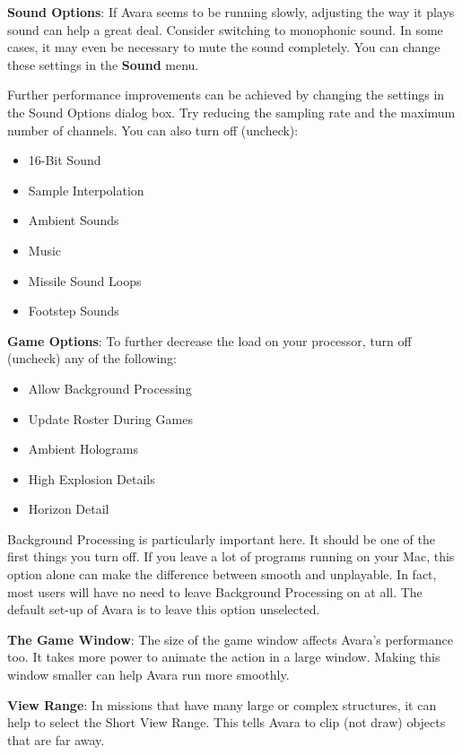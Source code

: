 \documentclass{article}
\begin{document}
\textbf{Sound Options}: If Avara seems to be running slowly, adjusting the way it plays sound can help a great deal. Consider switching to monophonic sound. In some cases, it may even be necessary to mute the sound completely. You can change these settings in the \textbf{Sound} menu.

Further performance improvements can be achieved by changing the settings in the Sound Options dialog box. Try reducing the sampling rate and the maximum number of channels. You can also turn off (uncheck):

\begin{itemize}
	\item 16-Bit Sound
	\item Sample Interpolation
	\item Ambient Sounds
	\item Music
	\item Missile Sound Loops
	\item Footstep Sounds
\end{itemize}

\textbf{Game Options}: To further decrease the load on your processor, turn off (uncheck) any of the following:

\begin{itemize}
	\item Allow Background Processing
	\item Update Roster During Games
	\item Ambient Holograms
	\item High Explosion Details
	\item Horizon Detail
\end{itemize}

Background Processing is particularly important here. It should be one of the first things you turn off. If you leave a lot of programs running on your Mac, this option alone can make the difference between smooth and unplayable. In fact, most users will have no need to leave Background Processing on at all. The default set-up of Avara is to leave this option unselected.

\textbf{The Game Window}: The size of the game window affects Avara's performance too. It takes more power to animate the action in a large window. Making this window smaller can help Avara run more smoothly.

\textbf{View Range}: In missions that have many large or complex structures, it can help to select the Short View Range. This tells Avara to clip (not draw) objects that are far away.
\end{document}
